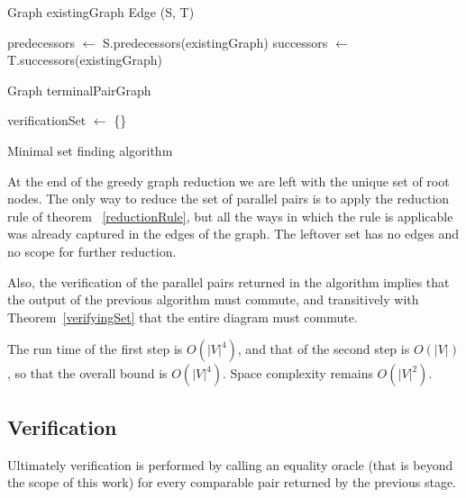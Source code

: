 \documentclass[sigplan,review,nonacm=true]{acmart}
\begin{document}
{\begin{algorithm}
\DontPrintSemicolon
{}
Graph existingGraph\;
Edge (S, T)\;
        
predecessors $\gets$ S.predecessors(existingGraph)\;
successors $\gets$ T.successors(existingGraph)\;

Graph terminalPairGraph\;

verificationSet $\gets$ \{\}\;
\;
\caption{Minimal set finding algorithm}
\label{algo_online_minimal}
\end{algorithm}

At the end of the greedy graph reduction we are left with the unique set of root nodes.
The only way to reduce the set of parallel pairs is to apply the reduction rule of theorem ~\ref{reductionRule}, but all the ways in which the rule is applicable was already captured in the edges of the graph. The leftover set has no edges and no scope for further reduction.

Also, the verification of the parallel pairs returned in the algorithm implies that the output of the previous algorithm must commute, and transitively with Theorem~\ref{verifyingSet} that the entire diagram must commute.

The run time of the first step is $O(|V|^4)$, and that of the second step is $O(|V|)$, so that the overall bound is $O(|V|^4)$.
Space complexity remains $O(|V|^2)$.

\subsection{Verification}
Ultimately verification is performed by calling an equality oracle (that is beyond the scope of this work) for every comparable pair returned by the previous stage.

}
\end{document}
